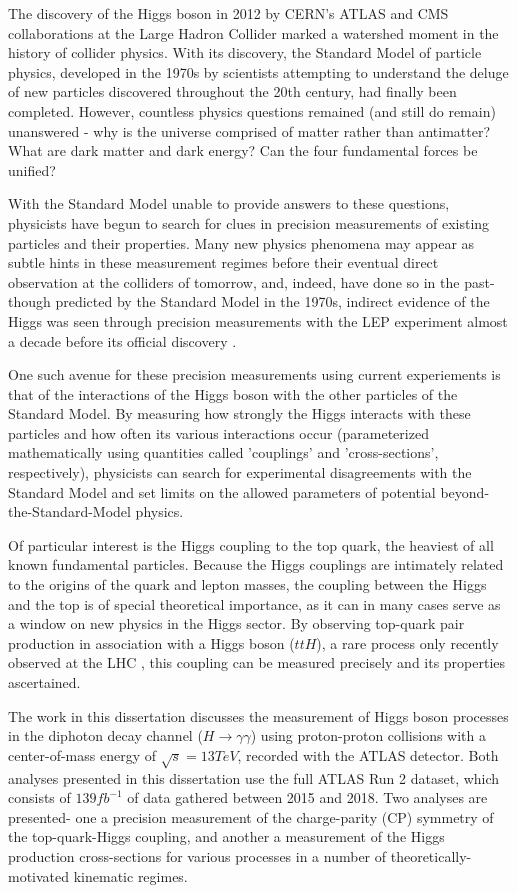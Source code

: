 The discovery of the Higgs boson in 2012 by CERN's ATLAS \cite{HiggsATLAS} and CMS \cite{HiggsCMS} collaborations at the Large Hadron Collider marked a watershed moment in the history of collider physics. With its discovery, the Standard Model of particle physics, developed in the 1970s by scientists attempting to understand the deluge of new particles discovered throughout the 20th century, had finally been completed. However, countless physics questions remained (and still do remain) unanswered - why is the universe comprised of matter rather than antimatter? What are dark matter and dark energy? Can the four fundamental forces be unified?

With the Standard Model unable to provide answers to these questions, physicists have begun to search for clues in precision measurements of existing particles and their properties. Many new physics phenomena may appear as subtle hints in these measurement regimes before their eventual direct observation at the colliders of tomorrow, and, indeed, have done so in the past- though predicted by the Standard Model in the 1970s, indirect evidence of the Higgs was seen through precision measurements with the LEP experiment almost a decade before its official discovery \cite{LEPExperiments}.

One such avenue for these precision measurements using current experiements is that of the interactions of the Higgs boson with the other particles of the Standard Model. By measuring how strongly the Higgs interacts with these particles and how often its various interactions occur (parameterized mathematically using quantities called 'couplings' and 'cross-sections', respectively), physicists can search for experimental disagreements with the Standard Model and set limits on the allowed parameters of potential beyond-the-Standard-Model physics.

Of particular interest is the Higgs coupling to the top quark, the heaviest of all known fundamental particles. Because the Higgs couplings are intimately related to the origins of the quark and lepton masses, the coupling between the Higgs and the top is of special theoretical importance, as it can in many cases serve as a window on new physics in the Higgs sector. By observing top-quark pair production in association with a Higgs boson ($ttH$), a rare process only recently observed at the LHC \cite{ttH}, this coupling can be measured precisely and its properties ascertained.

The work in this dissertation discusses the measurement of Higgs boson processes in the diphoton decay channel ($H \rightarrow \gamma \gamma$) using proton-proton collisions with a center-of-mass energy of $\sqrt{s} = 13 TeV$, recorded with the ATLAS detector.  Both analyses presented in this dissertation use the full ATLAS Run 2 dataset, which consists of $139 fb^{-1}$ of data gathered between 2015 and 2018. Two analyses are presented- one a precision measurement of the charge-parity (CP) symmetry of the top-quark-Higgs coupling, and another a measurement of the Higgs production cross-sections for various processes in a number of theoretically-motivated kinematic regimes.

